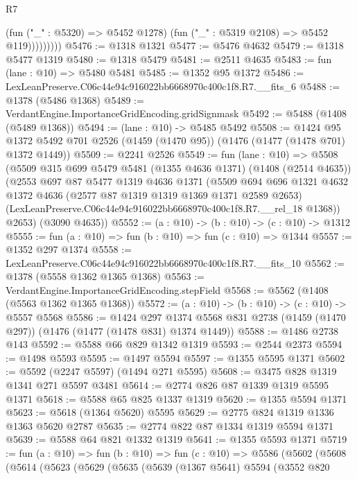 \begin{lexlean}{R7}
\begin{coremodule}
                    (fun ("_" : @5320) => @5452 @1278)
                    (fun ("_" : @5319 @2108) => @5452 @119)))))))))
@5476 := @1318 @1321
@5477 := @5476 @4632
@5479 := @1318 @5477 @1319
@5480 := @1318 @5479
@5481 := @2511 @4635
@5483 := fun (lane : @10) => @5480 @5481
@5485 := @1352 @95 @1372
@5486 := LexLeanPreserve.C06c44e94c916022bb6668970c400c1f8.R7.__fits_6
@5488 := @1378 (@5486 @1368)
@5489 := VerdantEngine.ImportanceGridEncoding.gridSignmask
@5492 := @5488 (@1408 (@5489 @1368))
@5494 := (lane : @10) -> @5485 @5492
@5508 := @1424
    @95
    @1372
    @5492
    @701
    @2526
    (@1459 (@1470 @95))
    (@1476 (@1477 (@1478 @701) @1372 @1449))
@5509 := @2241 @2526
@5549 := fun (lane : @10) =>
  @5508
    (@5509
      @315
      @699
      @5479
      @5481
      (@1355 @4636 @1371)
      (@1408 (@2514 @4635))
      (@2553
        @697
        @87
        @5477
        @1319
        @4636
        @1371
        (@5509
          @694
          @696
          @1321
          @4632
          @1372
          @4636
          (@2577 @87 @1319 @1319 @1369 @1371 @2589 @2653)
          (LexLeanPreserve.C06c44e94c916022bb6668970c400c1f8.R7.__rel_18 @1368))
        @2653)
      (@3090 @4635))
@5552 := (a : @10) -> (b : @10) -> (c : @10) -> @1312
@5555 := fun (a : @10) => fun (b : @10) => fun (c : @10) => @1344
@5557 := @1352 @297 @1374
@5558 := LexLeanPreserve.C06c44e94c916022bb6668970c400c1f8.R7.__fits_10
@5562 := @1378 (@5558 @1362 @1365 @1368)
@5563 := VerdantEngine.ImportanceGridEncoding.stepField
@5568 := @5562 (@1408 (@5563 @1362 @1365 @1368))
@5572 := (a : @10) -> (b : @10) -> (c : @10) -> @5557 @5568
@5586 := @1424
    @297
    @1374
    @5568
    @831
    @2738
    (@1459 (@1470 @297))
    (@1476 (@1477 (@1478 @831) @1374 @1449))
@5588 := @1486 @2738 @143
@5592 := @5588 @66 @829 @1342 @1319
@5593 := @2544 @2373
@5594 := @1498 @5593
@5595 := @1497 @5594
@5597 := @1355 @5595 @1371
@5602 := @5592 (@2247 @5597) (@1494 @271 @5595)
@5608 := @3475 @828 @1319 @1341 @271 @5597 @3481
@5614 := @2774 @826 @87 @1339 @1319 @5595 @1371
@5618 := @5588 @65 @825 @1337 @1319
@5620 := @1355 @5594 @1371
@5623 := @5618 (@1364 @5620) @5595
@5629 := @2775 @824 @1319 @1336 @1363 @5620 @2787
@5635 := @2774 @822 @87 @1334 @1319 @5594 @1371
@5639 := @5588 @64 @821 @1332 @1319
@5641 := @1355 @5593 @1371
@5719 := fun (a : @10) =>
  fun (b : @10) =>
  fun (c : @10) =>
  @5586
    (@5602
      (@5608
        (@5614
          (@5623
            (@5629
              (@5635
                (@5639
                  (@1367 @5641)
                  @5594
                  (@3552
                    @820

\end{coremodule}
\end{lexlean}
